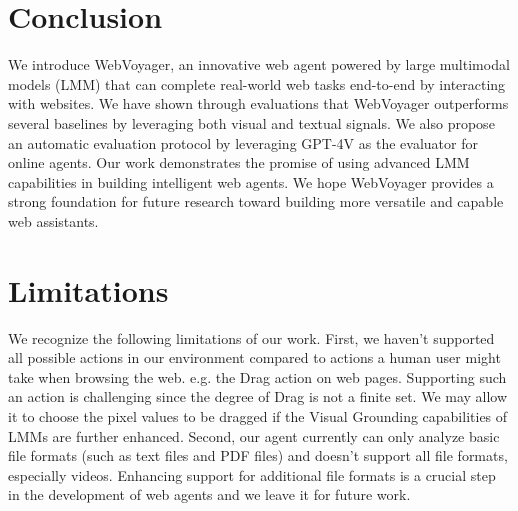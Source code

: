 \documentclass[11pt]{article}
\begin{document}
\section{Conclusion}

We introduce WebVoyager, an innovative web agent powered by large multimodal models (LMM) that can complete real-world web tasks end-to-end by interacting with websites. We have shown through evaluations that WebVoyager outperforms several baselines by leveraging both visual and textual signals. 
We also propose an automatic evaluation protocol by leveraging GPT-4V as the evaluator for online agents. 
Our work demonstrates the promise of using advanced LMM capabilities in building intelligent web agents. We hope WebVoyager provides a strong foundation for future research toward building more versatile and capable web assistants.


\section*{Limitations}
We recognize the following limitations of our work.
First, we haven't supported all possible actions in our environment compared to actions a human user might take when browsing the web. e.g. the Drag action on web pages. Supporting such an action is challenging since the degree of Drag is not a finite set. We may allow it to choose the pixel values to be dragged if the Visual Grounding capabilities of LMMs are further enhanced. Second, our agent currently can only analyze basic file formats (such as text files and PDF files) and doesn't support all file formats, especially videos. Enhancing support for additional file formats is a crucial step in the development of web agents and we leave it for future work. 
\end{document}
